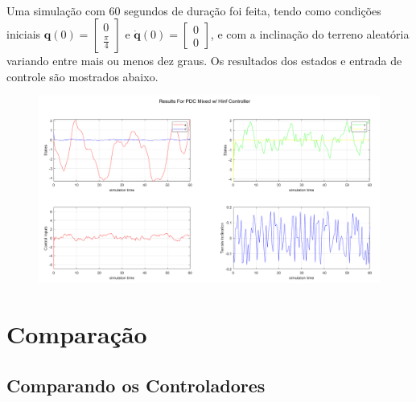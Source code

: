 \documentclass[a4paper,10pt]{article}
\begin{document}
\paragraph{}Uma simulação com 60 segundos de duração foi feita, tendo como condições iniciais $\bm{q}(0) = \begin{bmatrix}
	0 \\ \frac{\pi}{4}
\end{bmatrix}$ e $\dot{\bm{q}}(0) = \begin{bmatrix}
	0 \\ 0
\end{bmatrix}$, e com a inclinação do terreno aleatória variando entre mais ou menos dez graus. Os resultados dos estados e entrada de controle são mostrados abaixo.

\begin{figure}[H]
	\centering
	\includegraphics[scale = 0.5]{fig/PDCHresult}
\end{figure}

\section{Comparação}
\subsection{Comparando os Controladores}
\end{document}
